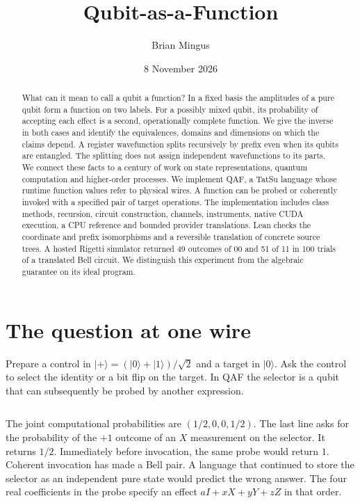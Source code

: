 \documentclass[a4paper,onecolumn,11pt,unpublished]{quantumarticle}
\newcommand{\ket}[1]{\lvert #1\rangle}
\begin{document}
\title{Qubit-as-a-Function}
\author{Brian Mingus}
\date{8 November 2026}
\maketitle
\begin{abstract}
What can it mean to call a qubit a function? In a fixed basis the amplitudes of a pure qubit form a function on two labels. For a possibly mixed qubit, its probability of accepting each effect is a second, operationally complete function. We give the inverse in both cases and identify the equivalences, domains and dimensions on which the claims depend. A register wavefunction splits recursively by prefix even when its qubits are entangled. The splitting does not assign independent wavefunctions to its parts. We connect these facts to a century of work on state representations, quantum computation and higher-order processes. We implement QAF, a TatSu language whose runtime function values refer to physical wires. A function can be probed or coherently invoked with a specified pair of target operations. The implementation includes class methods, recursion, circuit construction, channels, instruments, native CUDA execution, a CPU reference and bounded provider translations. Lean checks the coordinate and prefix isomorphisms and a reversible translation of concrete source trees. A hosted Rigetti simulator returned 49 outcomes of 00 and 51 of 11 in 100 trials of a translated Bell circuit. We distinguish this experiment from the algebraic guarantee on its ideal program.
\end{abstract}
\section{The question at one wire}
Prepare a control in $\ket{+}=(\ket0+\ket1)/\sqrt2$ and a target in $\ket0$. Ask the control to select the identity or a bit flip on the target. In QAF the selector is a qubit that can subsequently be probed by another expression.
\inputminted{qaf}{examples/prefix/callable.qaf}
The joint computational probabilities are $(1/2,0,0,1/2)$. The last line asks for the probability of the $+1$ outcome of an $X$ measurement on the selector. It returns $1/2$. Immediately before invocation, the same probe would return $1$. Coherent invocation has made a Bell pair. A language that continued to store the selector as an independent pure state would predict the wrong answer. The four real coefficients in the probe specify an effect $aI+xX+yY+zZ$ in that order.
\end{document}
